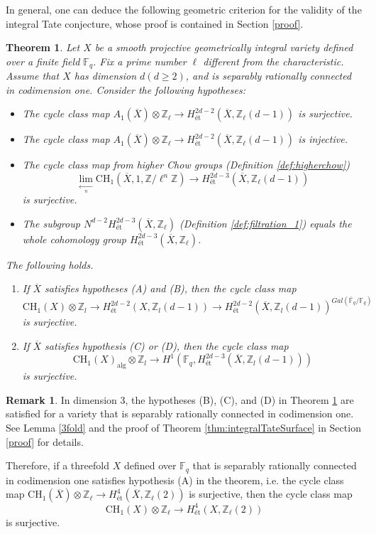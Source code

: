 \documentclass{amsart}
\newtheorem{thm}[theorem]{Theorem}
\theoremstyle{definition}
\newtheorem{rem}[theorem]{Remark}
\theoremstyle{remark}
\newcommand{\mbb}{\mathbb}
\newcommand{\FF}{\mbb{F}}
\newcommand{\ZZ}{\mbb{Z}}
\newcommand{\et}{\text{\'et}}
\begin{document}
 
In general, one can deduce the following geometric criterion for the validity of the integral Tate conjecture, whose proof is contained in Section \ref{proof}.
\begin{thm}\label{thm:integralTate}
Let $X$ be a smooth projective geometrically integral variety defined over a finite field $\FF_q$.
Fix a prime number $\ell$ different from the characteristic.
Assume that $X$ has dimension $d (d \geq 2)$, and is separably rationally connected in codimension one. Consider the following hypotheses:
\begin{itemize}
\item [(A)] The cycle class map $A_1(\overline{X})\otimes \ZZ_\ell \to H^{2d-2}_\text{\'et}(\overline{X}, \ZZ_\ell(d-1))$ is surjective.
\item [(B)] The cycle class map $A_1(\overline{X})\otimes \ZZ_\ell \to H^{2d-2}_\text{\'et}(\overline{X}, \ZZ_\ell(d-1))$ is injective.
\item [(C)] The cycle class map from higher Chow groups (Definition \ref{def:higherchow})
\[
\lim \limits_{\xleftarrow[n]{}}\text{CH}_1(\overline{X}, 1, \ZZ/\ell^n \ZZ) \to H^{2d-3}_\text{\'et}(\overline{X}, \ZZ_\ell(d-1))
\]
is surjective.
\item [(D)] The subgroup $N^{d-2}H^{2d-3}_\text{\'et}(\overline{X}, \ZZ_\ell)$ (Definition \ref{def:filtration_1}) equals the whole cohomology group $H^{2d-3}_\text{\'et}(\overline{X}, \ZZ_\ell)$.
\end{itemize}
The following holds.
\begin{enumerate}
    \item\label{1.10.1} If $\overline{X}$ satisfies hypotheses (A) and (B),
then the cycle class map
 \[
\text{CH}_1(X)\otimes \ZZ_l \to H^{2d-2}_\text{\'et}(X, \ZZ_l(d-1))\to  H^{2d-2}_\text{\'et}(\overline{X}, \ZZ_l(d-1))^{Gal(\bar{\FF}_q/\FF_q)}
 \] 
 is surjective.
 
 \item\label{1.10.2} If $\overline{X}$ satisfies hypothesis (C) or (D),
then the cycle class map
 \[
\text{CH}_1(X)_{\text{alg}}\otimes \ZZ_l \to H^1(\FF_q, H^{2d-3}_\text{\'et}(\overline{X}, \ZZ_l(d-1)))
 \] 
 is surjective.
\end{enumerate}

\end{thm}


\begin{rem}
In dimension $3$, the hypotheses (B), (C), and (D) in Theorem \ref{thm:integralTate} are satisfied for a variety that is separably rationally connected in codimension one. See Lemma \ref{3fold} and the proof of Theorem \ref{thm:integralTateSurface} in Section \ref{proof} for details.

Therefore, if a threefold $X$ defined over ${\FF}_q$ that is separably rationally connected in codimension one satisfies hypothesis (A) in the theorem, i.e. the cycle class map $\text{CH}_1(\overline{X})\otimes \ZZ_\ell \to H^4_\et(\overline{X}, \ZZ_\ell(2))$ is surjective, then the cycle class map $$\text{CH}_1({X})\otimes \ZZ_\ell \to H^4_\et({X}, \ZZ_\ell(2))$$ is surjective.
\end{rem}
\end{document}
